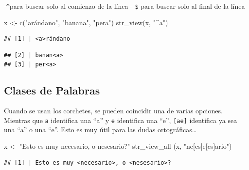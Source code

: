 \documentclass[
]{book}
\newenvironment{Shaded}{\begin{snugshade}}{\end{snugshade}}
\newcommand{\FunctionTok}[1]{\textcolor[rgb]{0.00,0.00,0.00}{#1}}
\newcommand{\NormalTok}[1]{#1}
\newcommand{\OtherTok}[1]{\textcolor[rgb]{0.56,0.35,0.01}{#1}}
\newcommand{\StringTok}[1]{\textcolor[rgb]{0.31,0.60,0.02}{#1}}
\begin{document}
-\texttt{\^{}}para buscar solo al comienzo de la línea - \texttt{\$} para buscar solo al final de la línea

\begin{Shaded}
\begin{Highlighting}[]
\NormalTok{x }\OtherTok{\textless{}{-}} \FunctionTok{c}\NormalTok{(}\StringTok{"arándano"}\NormalTok{, }\StringTok{"banana"}\NormalTok{, }\StringTok{"pera"}\NormalTok{)}
\FunctionTok{str\_view}\NormalTok{(x, }\StringTok{"\^{}a"}\NormalTok{)}
\end{Highlighting}
\end{Shaded}

\begin{verbatim}
## [1] | <a>rándano
\end{verbatim}

\begin{Shaded}
\end{Shaded}

\begin{verbatim}
## [2] | banan<a>
## [3] | per<a>
\end{verbatim}

\hypertarget{clases-de-palabras}{%
\subsection{Clases de Palabras}\label{clases-de-palabras}}

Cuando se usan los corchetes, se pueden coincidir una de varias opciones. Mientras que \texttt{a} identifica una ``a'' y \texttt{e} identifica una ``e'', \texttt{{[}ae{]}} identifica ya sea una ``a'' o una ``e''. Esto es muy útil para las dudas ortográficas\ldots{}

\begin{Shaded}
\begin{Highlighting}[]
\NormalTok{x }\OtherTok{\textless{}{-}} \StringTok{"Esto es muy necesario, o nesesario?"}
\FunctionTok{str\_view\_all}\NormalTok{ (x, }\StringTok{"ne[cs]e[cs]ario"}\NormalTok{)}
\end{Highlighting}
\end{Shaded}

\begin{verbatim}
## [1] | Esto es muy <necesario>, o <nesesario>?
\end{verbatim}
\end{document}
